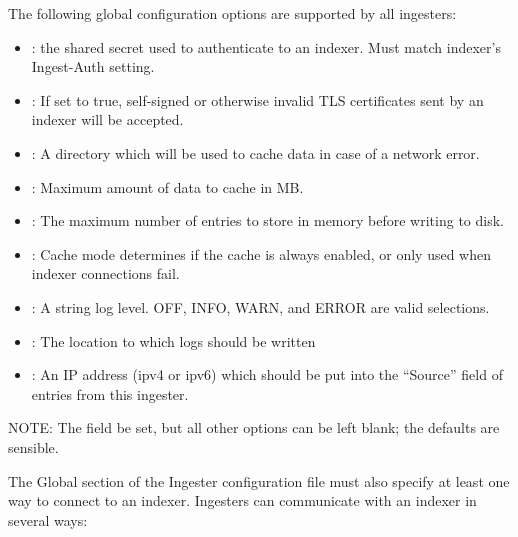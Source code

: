 The following global configuration options are supported by all
ingesters:

\begin{itemize}
\item
  : the shared secret used to authenticate to an
  indexer. Must match indexer's Ingest-Auth setting.
\item
  : If set to true, self-signed or otherwise
  invalid TLS certificates sent by an indexer will be accepted.
\item
  : A directory which will be used to cache data in case
  of a network error.
\item
  : Maximum amount of data to cache in MB.
\item
  : The maximum number of entries to store in memory before writing to disk. 
\item
  : Cache mode determines if the cache is always enabled, or only used when indexer connections fail.
\item
  : A string log level. OFF, INFO, WARN, and ERROR are
  valid selections.
\item
  : The location to which logs should be written
\item
  : An IP address (ipv4 or ipv6) which should be put
  into the ``Source'' field of entries from this ingester.
\end{itemize}

NOTE: The  field  be set, but all other options
can be left blank; the defaults are sensible.

The Global section of the Ingester configuration file must also specify
at least one way to connect to an indexer. Ingesters can communicate
with an indexer in several ways:

